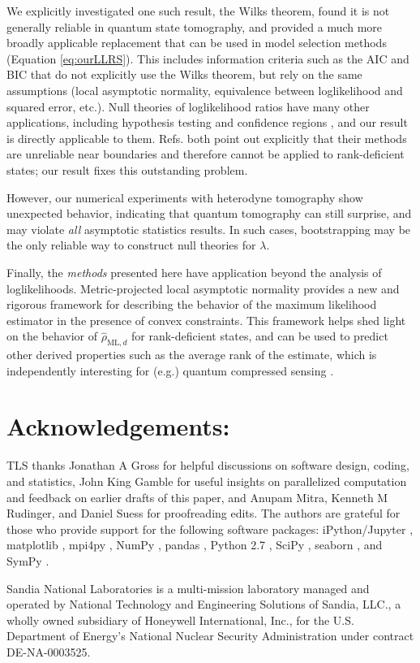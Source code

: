 \documentclass[aps,pra, twocolumn]{revtex4-1}
\newcommand{\rhohat}{\hat{\rho}}
\newcommand{\rhoML}[1]{\rhohat_{\scriptscriptstyle{\mathrm{ML},#1}}}
\begin{document}
We explicitly investigated one such result, the Wilks theorem, found it is not generally reliable in quantum state tomography, and provided  a much more broadly applicable replacement that can be used in model selection methods (Equation \eqref{eq:ourLLRS}).  This includes information criteria such as the AIC and BIC \cite{Akaike1974, Schwarz1978, Kass1995, Burnham2004} that do not explicitly use the Wilks theorem, but rely on the same assumptions (local asymptotic normality, equivalence between loglikelihood and squared error, etc.).  Null theories of loglikelihood ratios have many other applications, including hypothesis testing \cite{Blume-Kohout2010,Moroder2013} and confidence regions \cite{Glancy2012a}, and our result is directly applicable to them.  Refs. \cite{Moroder2013,Glancy2012a} both point out explicitly that their methods are unreliable near boundaries and therefore cannot be applied to rank-deficient states; our result fixes this outstanding problem.

However, our numerical experiments with heterodyne tomography show unexpected behavior, indicating that quantum tomography can still surprise, and may violate \emph{all} asymptotic statistics results.  In such cases, bootstrapping \cite{Efron1979, Higgins2004} may be the only reliable way to construct null theories for $\lambda$. 

Finally, the \emph{methods} presented here have application beyond the analysis of loglikelihoods.  Metric-projected local asymptotic normality provides a new and rigorous framework for describing the behavior of the maximum likelihood estimator in the presence of convex constraints. This framework helps shed light on the behavior of $\rhoML{d}$ for rank-deficient states, and can be used to predict other derived properties such as the average rank of the estimate, which is independently interesting for (e.g.) quantum compressed sensing \cite{Flammia2012a, Steffens2016, Kalev2015, Kalev2015a}.

\section{Acknowledgements:}
TLS thanks Jonathan A Gross for helpful discussions on software design, coding, and statistics, John King Gamble for useful insights on parallelized
computation and feedback on earlier drafts of this paper, and Anupam Mitra, Kenneth M Rudinger, and Daniel Suess for proofreading edits. The authors are grateful for those who provide support for the following software packages: iPython/Jupyter \cite{Perez}, matplotlib
\cite{Hunter2007}, mpi4py \cite{Dalcin2011},  NumPy \cite{VanDerWalt2011}, pandas \cite{mckinney2010}, Python 2.7 
\cite{vanRossum}, SciPy \cite{Oliphant2007a}, seaborn \cite{Waskom2016}, and SymPy \cite{Meurer2017}. 

Sandia National Laboratories is a multi-mission laboratory managed and operated by National Technology and Engineering Solutions of Sandia, LLC., a wholly owned subsidiary of Honeywell International, Inc., for the U.S. Department of Energy's National Nuclear Security Administration under contract DE-NA-0003525.



\end{document}
